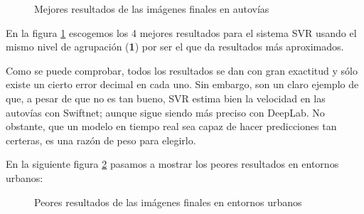 \vfill
\begin{figure}[H]
\centering
  \begin{subfigure}[b]{0.475\linewidth}
  \end{subfigure}
  \begin{subfigure}[b]{0.475\linewidth}
  \end{subfigure}
  \begin{subfigure}[b]{0.475\linewidth}
  \end{subfigure}
  \begin{subfigure}[b]{0.475\linewidth}
  \end{subfigure}
  \caption{Mejores resultados de las imágenes finales en autovías}
  \label{fig:SVR_Autovia_BIEN}
\end{figure}

En la figura \ref{fig:SVR_Autovia_BIEN} escogemos los 4 mejores resultados para el sistema \ac{SVR} usando el mismo nivel de agrupación (\textbf{1}) por ser el que da resultados más aproximados.

Como se puede comprobar, todos los resultados se dan con gran exactitud y sólo existe un cierto error decimal en cada uno. Sin embargo, son un claro ejemplo de que, a pesar de que no es tan bueno, \ac{SVR} estima bien la velocidad en las autovías con Swiftnet; aunque sigue siendo más preciso con DeepLab. No obstante, que un modelo en tiempo real sea capaz de hacer predicciones tan certeras, es una razón de peso para elegirlo.

En la siguiente figura \ref{fig:SVR_Urbano_MAL} pasamos a mostrar los peores resultados en entornos urbanos:

\begin{figure}[H]
\centering
  \begin{subfigure}[b]{0.475\linewidth}
  \end{subfigure}
  \begin{subfigure}[b]{0.475\linewidth}
  \end{subfigure}
  \begin{subfigure}[b]{0.475\linewidth}
  \end{subfigure}
  \begin{subfigure}[b]{0.475\linewidth}
  \end{subfigure}
  \caption{Peores resultados de las imágenes finales en entornos urbanos}
  \label{fig:SVR_Urbano_MAL}
\end{figure}

